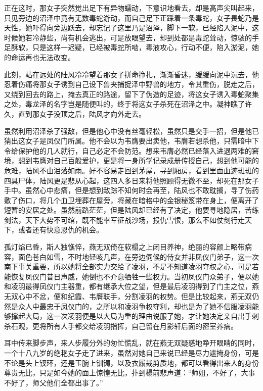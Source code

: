 正在这时，那女子突然觉出足下有异物蠕动，下意识地看去，却是高声尖叫起来，只见旁边的沼泽中竟有无数毒蛇游动，而自己足下正踩着一条毒蛇，女子畏蛇乃是天性，她吓得向旁边跃去，却忘记了这里乃是沼泽，脚下一软，已经陷入泥中，这时候她若冷静些，尚有机会逃出，可是放眼望去，却到处都是毒蛇耸动，惊骇的手足酥软，只是这样一迟疑，已经被毒蛇所啮，毒液攻心，行动不便，陷入淤泥，她的命运再也无法改变。

此刻，站在远处的陆风冷冷望着那女子拼命挣扎，渐渐昏迷，缓缓向泥中沉去，他忍着伤痛将那女子诱到自己设下兽夹捕捉泽中野兽的地方，令其重伤，脱走之后，又绕到回去的路上，掩去真正的路途，留下了伪造的足迹，将这女子诱入毒蛇聚集之处，毒龙泽的名字岂是随便叫的，终于将这女子杀死在沼泽之中。凝神瞧了许久，直到那女子没顶之后，陆风才向外走去。

虽然利用沼泽杀了强敌，但是他心中没有丝毫轻松，虽然只是交手一招，但是他已猜出这女子是凤仪门所属。他不会以为韦膺要出卖他，韦膺若想杀他，只需暗中下令给保护他的几人就行，自己必定不会防范。想来韦膺必然已经落入进退两难的窘境，想到韦膺对自己百般爱护，更是将一身所学记录成册传授自己，想到他可能的危难，陆风不由泪落如雨。好不容易走回到茅屋，寻到厢房，看到里面血迹斑斑的四具尸体，陆风更是悲从心起，这四人多日来将他照顾得无微不至，却死在那女子手中。虽然心中悲痛，但是想到敌踪不知何时会再至，陆风也不敢耽搁，寻了伤药敷了伤口，将几个血卫埋葬在屋旁，将藏在暗格中的金银秘笈带在身上，便离开了短暂的安居之处。虽然前路茫茫，但是陆风却已经有了决定，他要寻地隐居，苦练剑法，天下大势不可绾，既不能率军征战沙场，报仇雪恨，那么不如仗剑行走天下，或者还有快意恩仇的机会。

孤灯焰已昏，斯人独憔悴，燕无双倚在软榻之上闭目养神，绝丽的容颜上略带病容，面色苍白如雪，不时地轻咳几声，在旁边伺候的侍女并非凤仪门弟子，这一次南下事关重要，所以她将全部实力交给了凌羽，不是不知道凌羽夺权之心，可是若能恢复凤仪门昔日声威，她倒也不介意牺牲一些权力。当初凤仪门众弟子，便以她和凌羽最得凤仪门主器重，都有继承大位之望，但是最后凌羽得到了门主之位，燕无双心中不忿，便和纪霞、韦膺联手，分割凌羽的权势。但是比较起来，燕无双仍然是众人中最忠于凤仪门的，之所以和凌羽争权夺利，却也是为了她不信服凌羽能够撑起大局，这一次凌羽便是以大局为重的理由说服了她，才让她决定亲自出手刺杀石观，更将所有人手都交给凌羽指挥，自己留在月影轩后面的密室养病。

耳中传来脚步声，来人步履分外的匆忙慌乱，就在燕无双疑惑地睁开眼睛的同时，一个十八九岁的绝艳女子走了进来，虽然对她自己来说已经是尽力遮掩身份，可是不论是头上钗环，还是玉腕上钏镯，以及衣履裁剪质地，都可以看得出来人的身份尊贵无比，只是如今她的面上惊惶无比，扑到榻前悲声道：“师姐，不好了，大事不好了，师父他们全都出事了。”


